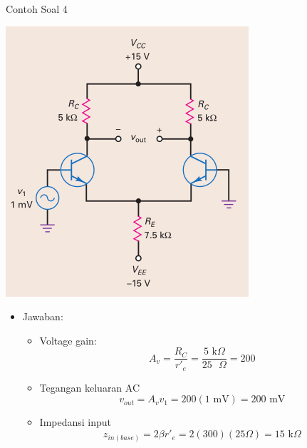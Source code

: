 \documentclass[aspectratio=169]{beamer}
\begin{document}
\begin{frame}{Contoh Soal 4}
	\begin{multicols}{2}
		\begin{center}
			\includegraphics[height=0.7\textheight]{gambar/01.contoh_soal_1-2}
		\end{center}
		\columnbreak
		\begin{itemize}
			\item Jawaban:
			\begin{itemize}
				\item Voltage gain:
				\[ A_v = \frac{R_C}{r'_e} = \frac{5 \text{ k}\Omega }{25 \text{ }\Omega } = 200 \]
				\item Tegangan keluaran AC
				\[ v_{out} = A_v v_1 = 200(1 \text{ mV}) = 200 \text{ mV} \]
				\item Impedansi input
				\[ z_{in(base)} = 2 \beta r'_e = 2(300)(25\Omega) = 15 \text{ k}\Omega\]
			\end{itemize}
		\end{itemize}
	\end{multicols}
\end{frame}
\end{document}
